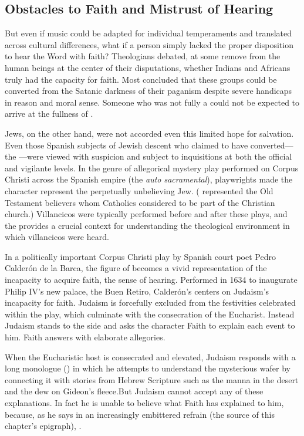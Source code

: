 \subsection{Obstacles to Faith and Mistrust of Hearing}

But even if music could be adapted for individual temperaments and translated across cultural differences, what if a person simply lacked the proper disposition to hear the Word with faith?
Theologians debated, at some remove from the human beings at the center of their disputations, whether Indians and Africans truly had the capacity for faith.\citXXX{}
Most concluded that these groups could be converted from the Satanic darkness of their paganism despite severe handicaps in reason and moral sense.
Someone who was not fully a  could not be expected to arrive at the fullness of .

Jews, on the other hand, were not accorded even this limited hope for salvation.
Even those Spanish subjects of Jewish descent who claimed to have converted---the ---were viewed with suspicion and subject to inquisitions at both the official and vigilante levels.\citXXX{}
In the genre of allegorical mystery play performed on  Corpus Christi across the Spanish empire (the \emph{auto sacramental}), playwrights made the character  represent the perpetually unbelieving Jew.\citXXX{}
( represented the Old Testament believers whom Catholics considered to be part of the Christian church.)\citXXX{}
Villancicos were typically performed before and after these plays, and the  provides a crucial context for understanding the theological environment in which villancicos were heard.

In a politically important Corpus Christi play by Spanish court poet Pedro Calderón de la Barca, the figure of  becomes a vivid representation of the incapacity to acquire faith,  the sense of hearing.
Performed in 1634 to inaugurate Philip IV's new palace, the Buen Retiro, Calderón's  centers on Judaism's incapacity for faith.%
  \autocite{Calderon:Retiro}
Judaism is forcefully excluded from the festivities celebrated within the play, which culminate with the consecration of the Eucharist.
Instead Judaism stands to the side and asks the character Faith to explain each event to him.
Faith answers with elaborate allegories.

When the Eucharistic host is consecrated and elevated, Judaism responds with a long monologue () in which he attempts to understand the mysterious wafer by connecting it with stories from Hebrew Scripture such as the manna in the desert and the dew on Gideon's fleece.
But Judaism cannot accept any of these explanations.
In fact he is unable to believe what Faith has explained to him, because, as he says in an increasingly embittered refrain (the source of this chapter's epigraph), .

